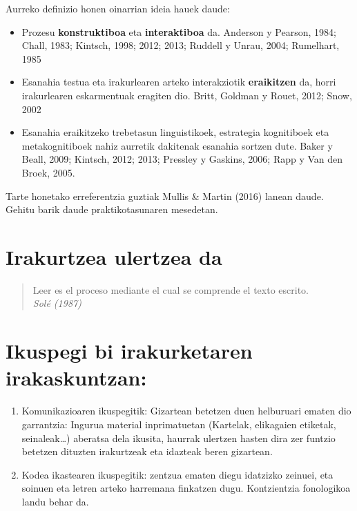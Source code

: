 \documentclass[
]{book}
\providecommand{\tightlist}{%
  \setlength{\itemsep}{0pt}\setlength{\parskip}{0pt}}
\begin{document}
Aurreko definizio honen oinarrian ideia hauek daude:

\begin{itemize}
\tightlist
\item
  Prozesu \textbf{konstruktiboa} eta \textbf{interaktiboa} da.
  Anderson y Pearson, 1984; Chall, 1983; Kintsch, 1998; 2012; 2013; Ruddell y Unrau, 2004; Rumelhart, 1985
\item
  Esanahia testua eta irakurlearen arteko interakziotik \textbf{eraikitzen} da, horri irakurlearen eskarmentuak eragiten dio.
  Britt, Goldman y Rouet, 2012; Snow, 2002
\item
  Esanahia eraikitzeko trebetasun linguistikoek, estrategia kognitiboek eta metakognitiboek nahiz aurretik dakitenak esanahia sortzen dute.
  Baker y Beall, 2009; Kintsch, 2012; 2013; Pressley y Gaskins, 2006; Rapp y Van den Broek, 2005.
\end{itemize}

Tarte honetako erreferentzia guztiak Mullis \& Martin (2016) lanean daude. Gehitu barik daude praktikotasunaren mesedetan.

\hypertarget{irakurtzea-ulertzea-da}{%
\section{Irakurtzea ulertzea da}\label{irakurtzea-ulertzea-da}}

\begin{quote}
Leer es el proceso mediante el cual se comprende el texto escrito.\\
\emph{Solé (1987)}
\end{quote}

\hypertarget{ikuspegi-bi-irakurketaren-irakaskuntzan}{%
\section{Ikuspegi bi irakurketaren irakaskuntzan:}\label{ikuspegi-bi-irakurketaren-irakaskuntzan}}

\begin{enumerate}
\def\labelenumi{\arabic{enumi}.}
\tightlist
\item
  Komunikazioaren ikuspegitik: Gizartean betetzen duen helburuari ematen dio
  garrantzia: Ingurua material inprimatuetan (Kartelak, elikagaien etiketak,
  seinaleak\ldots) aberatsa dela ikusita, haurrak ulertzen hasten dira zer funtzio betetzen
  dituzten irakurtzeak eta idazteak beren gizartean.
\item
  Kodea ikastearen ikuspegitik: zentzua ematen diegu idatzizko zeinuei, eta soinuen
  eta letren arteko harremana finkatzen dugu. Kontzientzia fonologikoa landu behar
  da.
\end{enumerate}
\end{document}
